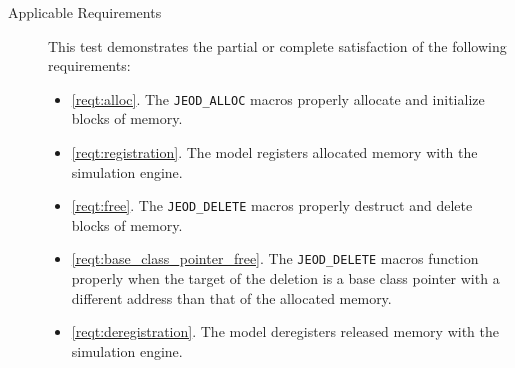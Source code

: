 \begin{description}
\item[Applicable Requirements]
This test demonstrates the partial or complete satisfaction of the 
following requirements:
\begin{itemize}
\item \ref{reqt:alloc}. The {\tt JEOD\_ALLOC} macros properly
  allocate and initialize blocks of memory.
\item \ref{reqt:registration}. The model registers allocated memory with
  the simulation engine.
\item \ref{reqt:free}. The {\tt JEOD\_DELETE} macros properly
  destruct and delete blocks of memory.
\item \ref{reqt:base_class_pointer_free}. The {\tt JEOD\_DELETE} macros
  function properly when the target of the deletion is a base class pointer
  with a different address than that of the allocated memory.
\item \ref{reqt:deregistration}. The model deregisters released memory
  with the simulation engine.
\end{itemize}

\end{description}